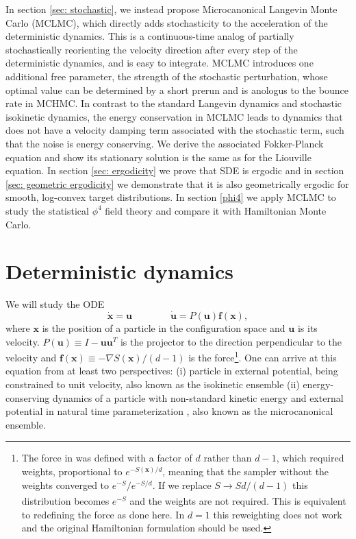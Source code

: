 \documentclass[tablecaption=bottom,wcp]{jmlr} %
\newcommand{\x}{\boldsymbol{x}}
\newcommand{\U}{\boldsymbol{u}}
\begin{document}
In section \ref{sec: stochastic}, we instead propose Microcanonical Langevin Monte Carlo (MCLMC), which directly adds stochasticity to the acceleration of the deterministic dynamics. This is a continuous-time analog of partially stochastically reorienting the velocity direction after every step of the deterministic dynamics, and is easy to integrate. MCLMC introduces one additional free parameter, the strength of the stochastic perturbation, whose optimal value can be determined by a short prerun \citep{MCHMC} and is anologus to the bounce rate in MCHMC.
In contrast to the standard Langevin dynamics and stochastic isokinetic dynamics, the energy 
conservation in MCLMC leads to dynamics that
does not have a velocity 
damping term associated with 
the stochastic term, such that 
the noise is energy conserving. 
We derive the 
associated Fokker-Planck 
equation and show its stationary solution is the same as for the
Liouville equation. 
In section \ref{sec: ergodicity} we prove that SDE is ergodic and in section \ref{sec: geometric ergodicity} we demonstrate that it is also geometrically ergodic for smooth, log-convex target distributions.
In section \ref{phi4} we apply MCLMC to study the statistical $\phi^4$ field theory and compare it with Hamiltonian Monte Carlo.


\section{Deterministic dynamics} \label{sec: deterministic}
We will study the ODE
\begin{equation} \label{eq: ODE}
    \dot{\x} = \U \qquad \qquad
    \dot{\U} = P(\U) \boldsymbol{f}(\x),
\end{equation}
where $\x$ is the position of a particle in the configuration space and $\U$ is its velocity.
$P(\U) \equiv I - \U \U^T$ is the projector to the direction perpendicular to the velocity and $\boldsymbol{f}(\x) \equiv - \nabla S(\x) / (d-1)$ is the force\footnote{The force in \cite{MCHMC,ESH} was defined with a factor of $d$ rather than $d-1$, which required weights, proportional to $e^{-S(\x) / d}$, meaning that the sampler without the weights converged to $e^{-S} / e^{-S/d}$. If we replace 
$S \xrightarrow[]{} S d / (d-1)$ this distribution becomes $e^{-S}$ and the weights are not required. This is equivalent to redefining the force as done here. In $d = 1$ this reweighting does not work and the original Hamiltonian formulation should be used.}.
One can arrive at this equation from at least two perspectives: 
(i) particle in external potential, being constrained to unit velocity, also known as the isokinetic ensemble
(ii) energy-conserving dynamics of a particle with non-standard kinetic energy and external potential in natural time parameterization \citep{MCHMC,ESH}, also known as the microcanonical ensemble.
\end{document}
